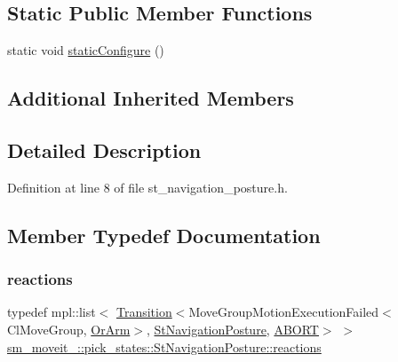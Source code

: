 \subsection*{Static Public Member Functions}
\begin{DoxyCompactItemize}
\item 
static void \hyperlink{structsm__moveit__4_1_1pick__states_1_1StNavigationPosture_a5b68787c63c17d99ab1e51d8d47b0e9f}{static\+Configure} ()
\end{DoxyCompactItemize}
\subsection*{Additional Inherited Members}


\subsection{Detailed Description}


Definition at line 8 of file st\+\_\+navigation\+\_\+posture.\+h.



\subsection{Member Typedef Documentation}
\mbox{\label{structsm__moveit__4_1_1pick__states_1_1StNavigationPosture_a8f3ad7c040b08e1da62aabb3caa6a8e9}} 
\subsubsection{\texorpdfstring{reactions}{reactions}}
{\footnotesize\ttfamily typedef mpl\+::list$<$ \hyperlink{classsmacc_1_1Transition}{Transition}$<$Move\+Group\+Motion\+Execution\+Failed$<$Cl\+Move\+Group, \hyperlink{classsm__moveit__4_1_1OrArm}{Or\+Arm}$>$, \hyperlink{structsm__moveit__4_1_1pick__states_1_1StNavigationPosture}{St\+Navigation\+Posture}, \hyperlink{structsmacc_1_1default__transition__tags_1_1ABORT}{A\+B\+O\+RT}$>$ $>$ \hyperlink{structsm__moveit__4_1_1pick__states_1_1StNavigationPosture_a8f3ad7c040b08e1da62aabb3caa6a8e9}{sm\+\_\+moveit\+\_\+::pick\+\_\+states\+::\+St\+Navigation\+Posture\+::reactions}}



